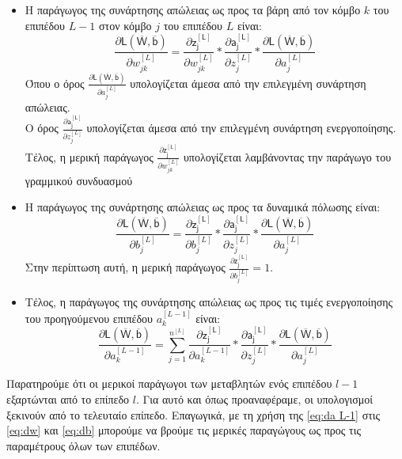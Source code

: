 \begin{itemize}
  \item Η παράγωγος της συνάρτησης απώλειας ως προς τα βάρη από τον κόμβο $k$ του επιπέδου $L-1$ στον κόμβο $j$ του επιπέδου $L$ είναι:
  \begin{equation}\label{eq:dw}
    \frac{\partial \mathsf{L(\overline{W},\overline{b})}}{{\partial w^{[L]}_{jk}}} = 
    \frac{\partial \mathsf{z_j^{[L]}}}{{\partial w^{[L]}_{jk}}} \ast
    \frac{\partial \mathsf{a_j^{[L]}}}{{\partial z_j^{[L]}}} \ast
    \frac{\partial \mathsf{L(\overline{W},\overline{b})}}{{\partial a^{[L]}_{j}}}
  \end{equation}
  Όπου ο όρος $\frac{\partial \mathsf{L(\overline{W},\overline{b})}}{{\partial a^{[L]}_{j}}}$ υπολογίζεται άμεσα από την επιλεγμένη συνάρτηση απώλειας.\\ 
  Ο όρος $\frac{\partial \mathsf{a_j^{[L]}}}{{\partial z_j^{[L]}}}$ υπολογίζεται άμεσα από την επιλεγμένη συνάρτηση ενεργοποίησης.\\
  Τέλος, η μερική παράγωγος $\frac{\partial \mathsf{z_j^{[L]}}}{{\partial w^{[L]}_{jk}}}$ υπολογίζεται λαμβάνοντας την παράγωγο του γραμμικού συνδυασμού 
  \item Η παράγωγος της συνάρτησης απώλειας ως προς τα δυναμικά πόλωσης είναι:
  \begin{equation}\label{eq:db}
    \frac{\partial \mathsf{L(\overline{W},\overline{b})}}{{\partial b^{[L]}_{j}}} = 
    \frac{\partial \mathsf{z_j^{[L]}}}{{\partial b^{[L]}_{j}}} \ast
    \frac{\partial \mathsf{a_j^{[L]}}}{{\partial z_j^{[L]}}} \ast
    \frac{\partial \mathsf{L(\overline{W},\overline{b})}}{{\partial a^{[L]}_{j}}}
  \end{equation}
  Στην περίπτωση αυτή, η μερική παράγωγος $\frac{\partial \mathsf{z_j^{[L]}}}{{\partial b^{[L]}_{j}}} = 1$.
  \item Τέλος, η παράγωγος της συνάρτησης απώλειας ως προς τις τιμές ενεργοποίησης του προηγούμενου επιπέδου $a^{[L-1]}_{k}$ είναι:
  \begin{equation}\label{eq:da L-1}
    \frac{\partial \mathsf{L(\overline{W},\overline{b})}}{{\partial a^{[L-1]}_{k}}} = 
\sum_{j = 1}^{n^{[L]}}     \frac{\partial \mathsf{z_j^{[L]}}}{{\partial a^{[L-1]}_{k}}} \ast
    \frac{\partial \mathsf{a_j^{[L]}}}{{\partial z_j^{[L]}}} \ast
    \frac{\partial \mathsf{L(\overline{W},\overline{b})}}{{\partial a^{[L]}_{j}}} 
  \end{equation}

\end{itemize}
Παρατηρούμε ότι οι μερικοί παράγωγοι των μεταβλητών ενός επιπέδου $l-1$ εξαρτώνται από το επίπεδο $l$. Για αυτό και όπως προαναφέραμε, οι υπολογισμοί ξεκινούν από το τελευταίο επίπεδο. Επαγωγικά, με τη χρήση της \ref{eq:da L-1} στις \ref{eq:dw} και \ref{eq:db} μπορούμε να βρούμε τις μερικές παραγώγους ως προς τις παραμέτρους όλων των επιπέδων.\par

